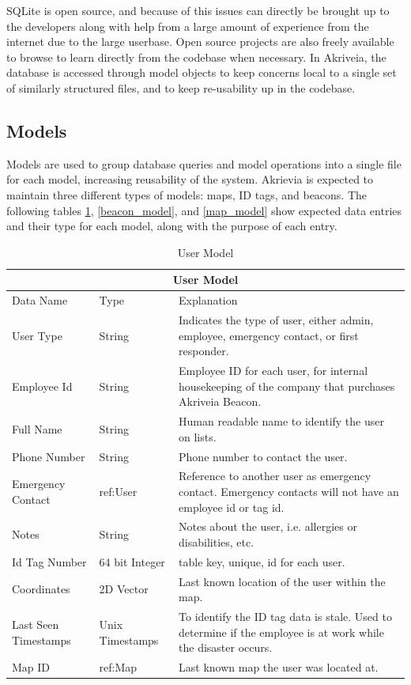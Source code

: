 \bigskip
SQLite is open source, and because of this issues can directly be brought up to the developers along with help from a large amount of experience from the internet due to the large userbase.
Open source projects are also freely available to browse to learn directly from the codebase when necessary.
In Akriveia, the database is accessed through model objects to keep concerns local to a single set of similarly structured files, and to keep re-usability up in the codebase.

\medskip
\subsection{Models}
\medskip
Models are used to group database queries and model operations into a single file for each model, increasing reusability of the system.
Akrievia is expected to maintain three different types of models: maps, ID tags, and beacons. The following tables \ref{user_model}, \ref{beacon_model}, and \ref{map_model} show expected data entries and their type for each model, along with the purpose of each entry.

\begin{table}[H]
\centering
\def\arraystretch{1.4}
\begin{tabular}{| m{3cm} | m{3cm} | m{9.5cm} |}
	\hline
	\multicolumn{3}{|c|}{User Model} \\
	\hline
	Data Name & Type & Explanation \\
	\hline
	User Type & String & Indicates the type of user, either admin, employee, emergency contact, or first responder. \\
	\hline
	Employee Id & String & Employee ID for each user, for internal housekeeping of the company that purchases Akriveia Beacon. \\
	\hline
	Full Name & String & Human readable name to identify the user on lists. \\
	\hline
	Phone Number & String & Phone number to contact the user. \\
	\hline
	Emergency Contact & ref:User & Reference to another user as emergency contact. Emergency contacts will not have an employee id or tag id. \\
	\hline
	Notes & String & Notes about the user, i.e. allergies or disabilities, etc. \\
	\hline
	Id Tag Number & 64 bit Integer & table key, unique, id for each user. \\
	\hline
	Coordinates & 2D Vector & Last known location of the user within the map. \\
	\hline
	Last Seen Timestamps & Unix Timestamps & To identify the ID tag data is stale. Used to determine if the employee is at work while the disaster occurs. \\
	\hline
	Map ID & ref:Map & Last known map the user was located at. \\
	\hline
\end{tabular}
\caption{User Model}
\label{user_model}
\end{table}

